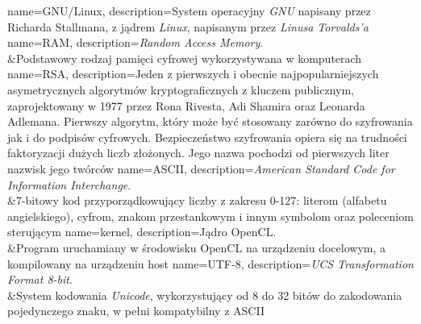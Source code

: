 %
%

{
	name={GNU/Linux},
	description={System operacyjny \emph{GNU} napisany przez Richarda Stallmana, z jądrem \emph{Linux}, napisanym przez \emph{Linusa Torvalds'a}}
}
{
	name={RAM},
	description={\textit{Random Access Memory}.\\&Podstawowy  rodzaj  pamięci  cyfrowej
   wykorzystywana w komputerach}
}
{
	name={RSA},
	description={Jeden z pierwszych i obecnie najpopularniejszych asymetrycznych algorytmów kryptograficznych z kluczem publicznym, zaprojektowany w 1977 przez Rona Rivesta, Adi Shamira oraz Leonarda Adlemana. Pierwszy algorytm, który może być stosowany zarówno do szyfrowania jak i do podpisów cyfrowych. Bezpieczeństwo szyfrowania opiera się na trudności faktoryzacji dużych liczb złożonych. Jego nazwa pochodzi od pierwszych liter nazwisk jego twórców}
}
{
	name={ASCII},
	description={\textit{American Standard Code for Information Interchange}.\\&7-bitowy kod przyporządkowujący liczby z zakresu 0-127: literom (alfabetu angielskiego), cyfrom, znakom przestankowym i innym symbolom oraz poleceniom sterującym}
}
{
	name={kernel},
	description={Jądro \gls{OpenCL}.\\&Program uruchamiany w środowisku OpenCL na urządzeniu docelowym, a kompilowany na urządzeniu host}
}
{
	name={UTF-8},
	description={\textit{UCS Transformation Format 8-bit}.\\&System kodowania \emph{Unicode}, wykorzystujący od 8 do 32 bitów do zakodowania pojedynczego znaku, w pełni kompatybilny z \gls{ASCII}}
}

